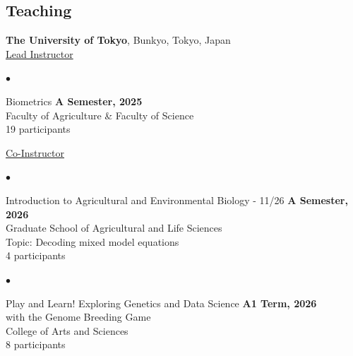 \documentclass[margin,line,10pt]{res}
\newenvironment{list2}{
  \begin{list}{$\bullet$}{%
      \setlength{\itemsep}{0in}
      \setlength{\parsep}{0in} \setlength{\parskip}{0in}
      \setlength{\topsep}{0in} \setlength{\partopsep}{0in} 
      \setlength{\leftmargin}{0.2in}}}{\end{list}}
\begin{document}
\begin{resume}
\vspace{0.5cm}
\section{\sc Teaching}
{\bf The University of Tokyo}, Bunkyo, Tokyo, Japan \vspace{0.2cm} \\
\underline{Lead Instructor} 
\vspace{0.4cm}
\begin{list2}
  \item Biometrics \hfill {\bf A Semester, 2025} \\ %
  Faculty of Agriculture \& Faculty of Science \\ %
  19  participants 
\end{list2}


\vspace{0.4cm}
\underline{Co-Instructor} 
\vspace{0.4cm}







\begin{list2}
  \item Introduction to Agricultural and Environmental Biology - 11/26 \hfill {\bf A Semester, 2026} \\ %
  Graduate School of Agricultural and Life Sciences \\ %
  Topic: Decoding mixed model equations \\
  4  participants 
\end{list2}


\vspace{0.4cm}



\begin{list2}
  \item  Play and Learn! Exploring Genetics and Data Science  \hfill {\bf A1 Term, 2026} \\ %
  with the Genome Breeding Game \\
  College of Arts and Sciences \\ %
  8  participants 
\end{list2}



\end{resume}
\end{document}
